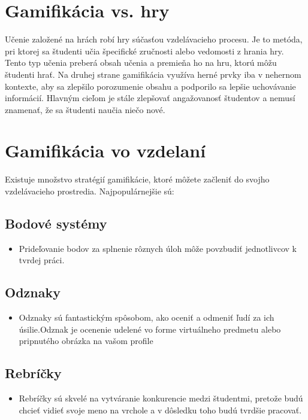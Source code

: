 \documentclass[10pt,twoside,slovak,a4paper]{article}
\begin{document}
\section{Gamifikácia vs. hry} 
Učenie založené na hrách robí hry súčasťou vzdelávacieho procesu.
Je to metóda, pri ktorej sa študenti učia špecifické zručnosti alebo vedomosti z hrania hry.
Tento typ učenia preberá obsah učenia a premieňa ho na hru, ktorú môžu študenti hrať.
Na druhej strane gamifikácia využíva herné prvky iba v nehernom kontexte, aby sa zlepšilo porozumenie obsahu a podporilo sa lepšie uchovávanie informácií.
Hlavným cieľom je stále zlepšovať angažovanosť študentov a nemusí znamenať, že sa študenti naučia niečo nové.


\section{Gamifikácia vo vzdelaní} 

Existuje množstvo stratégií gamifikácie, ktoré môžete začleniť do svojho vzdelávacieho prostredia.
Najpopulárnejšie sú\cite{buljan}: 
\subsection{Bodové systémy}
    \begin{itemize}
    \item Prideľovanie bodov za splnenie rôznych úloh môže povzbudiť    jednotlivcov k tvrdej práci.
    \end{itemize}

\subsection{Odznaky}
    
    \begin{itemize}
    \item  Odznaky sú fantastickým spôsobom, ako oceniť a odmeniť ľudí za ich úsilie.Odznak je ocenenie udelené vo forme virtuálneho predmetu alebo pripnutého obrázka na vašom profile
    \end{itemize}
 
\subsection{Rebríčky} 

    \begin{itemize}
    \item Rebríčky sú skvelé na vytváranie konkurencie medzi študentmi, pretože budú chcieť vidieť svoje meno na vrchole a v dôsledku toho budú tvrdšie pracovať.
    \end{itemize}
\end{document}

